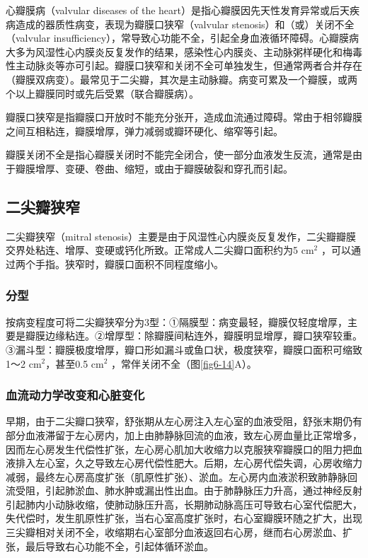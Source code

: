 心瓣膜病（valvular diseases of the
heart）是指心瓣膜因先天性发育异常或后天疾病造成的器质性病变，表现为瓣膜口狭窄（valvular
stenosis）和（或）关闭不全（valvular
insufficiency），常导致心功能不全，引起全身血液循环障碍。心瓣膜病大多为风湿性心内膜炎反复发作的结果，感染性心内膜炎、主动脉粥样硬化和梅毒性主动脉炎等亦可引起。瓣膜口狭窄和关闭不全可单独发生，但通常两者合并存在（瓣膜双病变）。最常见于二尖瓣，其次是主动脉瓣。病变可累及一个瓣膜，或两个以上瓣膜同时或先后受累（联合瓣膜病）。

瓣膜口狭窄是指瓣膜口开放时不能充分张开，造成血流通过障碍。常由于相邻瓣膜之间互相粘连，瓣膜增厚，弹力减弱或瓣环硬化、缩窄等引起。

瓣膜关闭不全是指心瓣膜关闭时不能完全闭合，使一部分血液发生反流，通常是由于瓣膜增厚、变硬、卷曲、缩短，或由于瓣膜破裂和穿孔而引起。

\subsection{二尖瓣狭窄}

二尖瓣狭窄（mitral
stenosis）主要是由于风湿性心内膜炎反复发作，二尖瓣瓣膜交界处粘连、增厚、变硬或钙化所致。正常成人二尖瓣口面积约为5
cm$^2$ ，可以通过两个手指。狭窄时，瓣膜口面积不同程度缩小。

\subsubsection{分型}

按病变程度可将二尖瓣狭窄分为3型：①隔膜型：病变最轻，瓣膜仅轻度增厚，主要是瓣膜边缘粘连。②增厚型：除瓣膜间粘连外，瓣膜明显增厚，瓣口狭窄较重。③漏斗型：瓣膜极度增厚，瓣口形如漏斗或鱼口状，极度狭窄，瓣膜口面积可缩致1～2
cm$^2$，甚至0.5 cm$^2$ ，常伴关闭不全（图\ref{fig6-14}A）。

\subsubsection{血流动力学改变和心脏变化}

早期，由于二尖瓣口狭窄，舒张期从左心房注入左心室的血液受阻，舒张末期仍有部分血液滞留于左心房内，加上由肺静脉回流的血液，致左心房血量比正常增多，因而左心房发生代偿性扩张，左心房心肌加大收缩力以克服狭窄瓣膜口的阻力把血液排入左心室，久之导致左心房代偿性肥大。后期，左心房代偿失调，心房收缩力减弱，最终左心房高度扩张（肌原性扩张）、淤血。左心房内血液淤积致肺静脉回流受阻，引起肺淤血、肺水肿或漏出性出血。由于肺静脉压力升高，通过神经反射引起肺内小动脉收缩，使肺动脉压升高，长期肺动脉高压可导致右心室代偿肥大，失代偿时，发生肌原性扩张，当右心室高度扩张时，右心室瓣膜环随之扩大，出现三尖瓣相对关闭不全，收缩期右心室部分血液返回右心房，继而右心房淤血、扩张，最后导致右心功能不全，引起体循环淤血。

